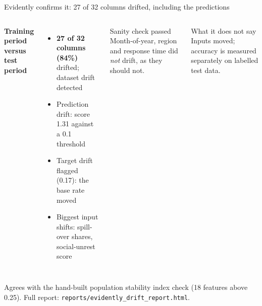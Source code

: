 \documentclass[aspectratio=169,11pt]{beamer}
\newcommand{\code}[1]{\texttt{#1}}
\newcommand{\hl}[1]{{\color{navy}\textbf{#1}}}
\begin{document}
\begin{frame}{Evidently confirms it: 27 of 32 columns drifted, including the predictions}
  \begin{columns}[T]
    \textbf{Training period versus test period}
    \begin{itemize}\setlength{\itemsep}{4pt}
      \item \hl{27 of 32 columns (84\%)} drifted; dataset drift detected
      \item \alert{Prediction drift}: score 1.31 against a 0.1 threshold
      \item Target drift flagged (0.17): the base rate moved
      \item Biggest input shifts: spill-over shares, social-unrest score
    \end{itemize}
    \begin{block}{Sanity check passed}
      \small Month-of-year, region and response time did \emph{not} drift, as they should not.
    \end{block}
    \begin{block}{What it does not say}
      \small Inputs moved; accuracy is measured separately on labelled test data.
    \end{block}
  \end{columns}
  \vspace{4pt}
  {\footnotesize Agrees with the hand-built population stability index check (18 features above 0.25). Full report: \code{reports/evidently\_drift\_report.html}.\par}
\end{frame}
\end{document}
